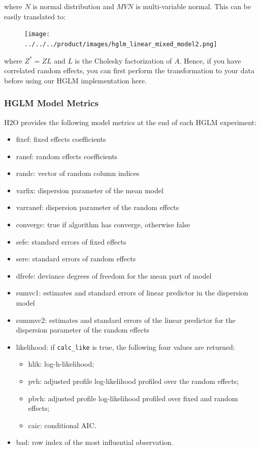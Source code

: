 where $N$ is normal distribution and $MVN$ is multi-variable normal. This can be easily translated to:

\begin{figure}[H]
\centering
\texttt{[image: ../../../product/images/hglm\_linear\_mixed\_model2.png]}
\end{figure}

where $Z^* = ZL$ and $L$ is the Cholesky factorization of $A$. Hence, if you have correlated random effects, you can first perform the transformation to your data before using our HGLM implementation here.

\subsubsection{HGLM Model Metrics}

H2O provides the following model metrics at the end of each HGLM experiment:

\begin{itemize}
    \item fixef: fixed effects coefficients
    \item ranef: random effects coefficients
    \item randc: vector of random column indices
    \item varfix: dispersion parameter of the mean model
    \item varranef: dispersion parameter of the random effects
    \item converge: true if algorithm has converge, otherwise false
    \item sefe: standard errors of fixed effects
    \item sere: standard errors of random effects
    \item dfrefe: deviance degrees of freedom for the mean part of model
    \item sumvc1: estimates and standard errors of linear predictor in the dispersion model
    \item summvc2: estimates and standard errors of the linear predictor for the dispersion parameter of the random effects
    \item likelihood: if \texttt{calc\_like} is true, the following four values are returned:
    
    	\begin{itemize}
		\item hlik: log-h-likelihood;
                 \item pvh: adjusted profile log-likelihood profiled over the random effects;
                 \item pbvh: adjusted profile log-likelihood profiled over fixed and random effects;
                 \item caic: conditional AIC.
	\end{itemize}
	
    \item bad: row index of the most influential observation.
\end{itemize}

